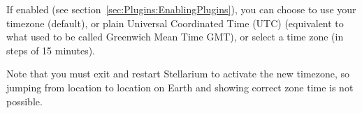 If enabled (see section~\ref{sec:Plugins:EnablingPlugins}), you can
choose to use your timezone (default), or plain Universal Coordinated
Time (UTC) (equivalent to what used to be called Greenwich Mean Time
GMT), or select a time zone (in steps of 15 minutes). 

Note that you must exit and restart Stellarium to activate the new
timezone, so jumping from location to location on Earth and showing
correct zone time is not possible.




